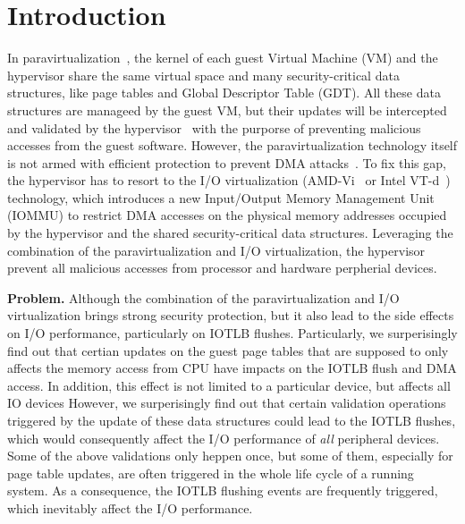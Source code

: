 \section{Introduction} \label{sec:intro}
In paravirtualization~\cite{XEN-SOSP03,denali-paravirtualization}, the kernel of each guest Virtual Machine (VM) and the hypervisor share the same virtual space and many security-critical data structures, like page tables and Global Descriptor Table (GDT). All these data structures are manageed by the guest VM, but their updates will be intercepted and validated by the hypervisor~\cite{XEN-SOSP03} with the purporse of preventing malicious accesses from the guest software.
However, the paravirtualization technology itself is not armed with efficient protection to prevent DMA attacks~\cite{disaggregation}.
To fix this gap, the hypervisor has to resort to the I/O virtualization (AMD-Vi~\cite{amdvt} or Intel VT-d~\cite{intelvt}) technology, which introduces a new Input/Output Memory Management Unit (IOMMU) to restrict DMA accesses on the physical memory addresses occupied by the hypervisor and the shared security-critical data structures. 
Leveraging the combination of the paravirtualization and I/O virtualization, the hypervisor prevent all malicious accesses from processor and hardware perpherial devices.

\textbf{Problem.} Although the combination of the paravirtualization and I/O virtualization brings strong security protection, but it also lead to the side effects on I/O performance, particularly on IOTLB flushes. 
Particularly, we surperisingly find out that certian updates on the guest page tables that are supposed to only affects the memory access from CPU have impacts on the IOTLB flush and DMA access. 
In addition, this effect is not limited to a particular device, but affects all IO devices
However, we surperisingly find out that certain validation operations triggered by the update of these data structures could lead to the IOTLB flushes, which would consequently affect the I/O performance of \emph{all} peripheral devices.
Some of the above validations only heppen once, but some of them, especially for page table updates, are often triggered in the whole life cycle of a running system. 
As a consequence, the IOTLB flushing events are frequently triggered, which inevitably affect the I/O performance.

